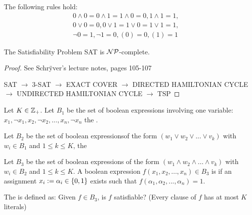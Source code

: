 The following rules hold: \begin{align*}
	0 \wedge 0 = 0 \wedge 1 = 1 \wedge 0 = 0, 1 \wedge 1 = 1,\\
	0\vee 0 = 0, 0 \vee 1 = 1 \vee 0 = 1\vee 1=1,\\
	\neg 0 = 1, \neg 1 = 0, (0) = 0, (1) = 1
\end{align*}

\begin{thm}
	The Satisfiability Problem SAT is $\mathcal{NP}$-complete.
\end{thm}
\begin{proof}
	See Schr\"yver's lecture notes, pages 105-107
	
	SAT $\rightarrow$ 3-SAT $\rightarrow$ EXACT COVER $\rightarrow$ DIRECTED HAMILTONIAN CYCLE $\rightarrow$ UNDIRECTED HAMILTONIAN CYCLE $\rightarrow$ TSP
\end{proof}

\begin{defn}
Let $K \in \mathbb{Z}_+$. Let $B_1$ be the set of boolean expressions involving one variable: $x_1, \neg x_1, x_2, \neg x_2, ...,x_n, \neg x_n$ the .

Let $B_2$ be the set of boolean expressionsof the form $(w_1 \vee w_2 \vee ... \vee v_k)$ with $w_i \in B_1$ and $1 \leq k \leq K$, the 

Let $B_3$ be the set of boolean expressions of the form $(w_1 \wedge w_2 \wedge ... \wedge v_k)$ with $w_i \in B_2$ and $1 \leq k \leq K$. A boolean expression $f(x_1, x_2, ..., x_n)\in B_3$ is  if an assignment $x_i:=\alpha_i\in\left\{0,1\right\}$ exists such that $f(\alpha_1, \alpha_2, ..., \alpha_n) = 1$.

The  is defined as: Given $f \in B_3$, is $f$ satisfiable? (Every clause of $f$ has at most $K$ literals)
\end{defn}

